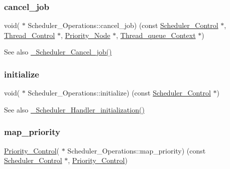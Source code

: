\subsubsection{\texorpdfstring{cancel\_job}{cancel\_job}}
{\footnotesize\ttfamily void( $\ast$ Scheduler\+\_\+\+Operations\+::cancel\+\_\+job) (const \mbox{\hyperlink{struct__Scheduler__Control}{Scheduler\+\_\+\+Control}} $\ast$, \mbox{\hyperlink{struct__Thread__Control}{Thread\+\_\+\+Control}} $\ast$, \mbox{\hyperlink{structPriority__Node}{Priority\+\_\+\+Node}} $\ast$, \mbox{\hyperlink{structThread__queue__Context}{Thread\+\_\+queue\+\_\+\+Context}} $\ast$)}

\begin{DoxySeeAlso}{See also}
\mbox{\hyperlink{group__RTEMSScoreScheduler_gaa4fcdf5fd641701ca171698b0ce20032}{\+\_\+\+Scheduler\+\_\+\+Cancel\+\_\+job()}} 
\end{DoxySeeAlso}
\mbox{\label{structScheduler__Operations_aae7916959595359dc4de3899dcd5d641}} 
\subsubsection{\texorpdfstring{initialize}{initialize}}
{\footnotesize\ttfamily void( $\ast$ Scheduler\+\_\+\+Operations\+::initialize) (const \mbox{\hyperlink{struct__Scheduler__Control}{Scheduler\+\_\+\+Control}} $\ast$)}

\begin{DoxySeeAlso}{See also}
\mbox{\hyperlink{group__RTEMSScoreScheduler_ga17385f03f24b3fe3ead98e17b612ef32}{\+\_\+\+Scheduler\+\_\+\+Handler\+\_\+initialization()}} 
\end{DoxySeeAlso}
\mbox{\label{structScheduler__Operations_aea4436ee4fab8bbfea5f6c5dd7a89626}} 
\subsubsection{\texorpdfstring{map\_priority}{map\_priority}}
{\footnotesize\ttfamily \mbox{\hyperlink{group__RTEMSScorePriority_ga59d02b58072d31a9a1cfe644557aefe2}{Priority\+\_\+\+Control}}( $\ast$ Scheduler\+\_\+\+Operations\+::map\+\_\+priority) (const \mbox{\hyperlink{struct__Scheduler__Control}{Scheduler\+\_\+\+Control}} $\ast$, \mbox{\hyperlink{group__RTEMSScorePriority_ga59d02b58072d31a9a1cfe644557aefe2}{Priority\+\_\+\+Control}})}

